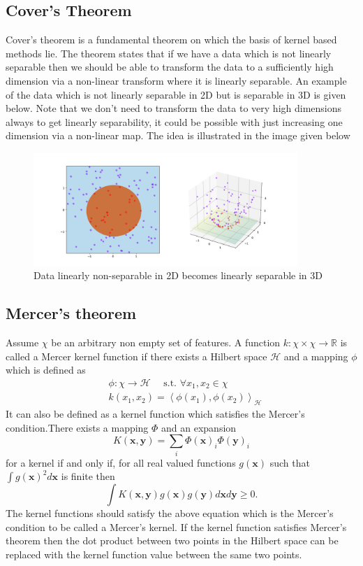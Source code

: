 \documentclass[../main.tex]{subfiles}
\begin{document}
    \subsection{Cover's Theorem}
    Cover's theorem is a fundamental theorem on which the basis of kernel based methods lie. The theorem states that if we have a data which is not linearly separable then we should be able to transform the data to a sufficiently high dimension via a non-linear transform where it is linearly separable.
    \newline
    An example of the data which is not linearly separable in 2D but is separable in 3D is given below. Note that we don't need to transform the data to very high dimensions always to get linearly separability, it could be possible with just increasing one dimension via a non-linear map. The idea is illustrated in the image given below
    \begin{figure}[htp]
    \centering
    \includegraphics[width=10cm]{H1.png}
    \caption{Data linearly non-separable in 2D becomes linearly separable in 3D}
    \label{fig:Data linearlly non-separable in 2D becomes linearly separable in 3D}
    \end{figure}

    \subsection{Mercer's theorem}
Assume $\chi$ be an arbitrary non empty set of features. A function $k: \chi \times \chi \rightarrow \mathbb{R}$ is called a Mercer kernel function if there exists a Hilbert space $\mathcal{H}$ and a mapping $\phi$ which is defined as
$$
\begin{aligned}
&\phi: \chi \rightarrow \mathcal{H} \quad \text { s.t. } \forall x_{1}, x_{2} \in \chi \\
&k\left(x_{1}, x_{2}\right)=\left\langle\phi\left(x_{1}\right), \phi\left(x_{2}\right)\right\rangle_{\mathcal{H}}
\end{aligned}
$$
It can also be defined as a kernel function which satisfies the Mercer's condition.There exists a mapping $\Phi$ and an expansion $$
K(\mathbf{x}, \mathbf{y})=\sum_{i} \Phi(\mathbf{x})_{i} \Phi(\mathbf{y})_{i}
$$ for a kernel
if and only if, for all real valued functions $g(\mathbf{x})$ such that $\int g(\mathbf{x})^{2} d \mathbf{x}$ is finite then
$$
\int K(\mathbf{x}, \mathbf{y}) g(\mathbf{x}) g(\mathbf{y}) d \mathbf{x} d \mathbf{y} \geq 0 .
$$
The kernel functions should satisfy the above equation which is the Mercer's condition to be called a Mercer's kernel. If the kernel function satisfies Mercer's theorem then the dot product between two points in the Hilbert space can be replaced with the kernel function value between the same two points.
    
\end{document}
